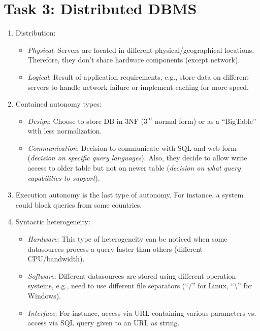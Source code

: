 \documentclass{scrartcl}
\begin{document}
	\section*{Task 3: Distributed DBMS}
	\begin{enumerate}
		\item Distribution:
		\begin{itemize}
			\item \textit{Physical}: Servers are located in different physical/geographical locations.
			Therefore, they don't share hardware components (except network).
			
			\item \textit{Logical}: Result of application requirements, e.g., store data on different servers to handle network failure or implement caching for more speed.
		\end{itemize}
	
		\item Contained autonomy types:
		\begin{itemize}
			\item \textit{Design}: Choose to store DB in 3NF ($3^{\text{rd}}$ normal form) or as a \enquote{BigTable} with less normalization.
			\item \textit{Communication}: Decision to communicate with SQL and web form (\textit{decision on specific query languages}).
			Also, they decide to allow write access to older table but not on newer table (\textit{decision on what query capabilities to support}).
		\end{itemize}
	
		\item Execution autonomy is the last type of autonomy.
		For instance, a system could block queries from some countries.
		
		\item Syntactic heterogeneity:
		\begin{itemize}
			\item \textit{Hardware}: This type of heterogeneity can be noticed when some datasources process a query faster than others (different CPU/bandwidth).
			
			\item \textit{Software}: Different datasources are stored using different operation systems, e.g., need to use different file separators (\enquote{/} for Linux, \enquote{\textbackslash} for Windows).
			
			\item \textit{Interface}: For instance, access via URL containing various parameters vs. access via SQL query given to an URL as string.
		\end{itemize}
	

\end{enumerate}
\end{document}

